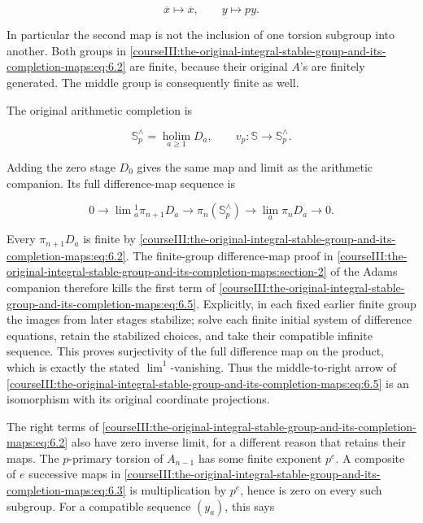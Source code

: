 \begin{equation}
\overline x\longmapsto\overline x,
 \qquad y\longmapsto py.
 \label{courseIII:the-original-integral-stable-group-and-its-completion-maps:eq:6.3}
\end{equation}

In particular the second map is not the inclusion of one torsion subgroup into another. Both groups in \eqref{courseIII:the-original-integral-stable-group-and-its-completion-maps:eq:6.2} are finite, because their original \(A\)'s are finitely generated. The middle group is consequently finite as well.

The original arithmetic completion is

\begin{equation}
\mathbb S^{\wedge}_p=\operatorname*{holim}_{a\geq1}D_a,
 \qquad v_p:\mathbb S\longrightarrow\mathbb S^{\wedge}_p.
 \label{courseIII:the-original-integral-stable-group-and-its-completion-maps:eq:6.4}
\end{equation}

Adding the zero stage \(D_0\) gives the same map and limit as the arithmetic companion. Its full difference-map sequence is

\begin{equation}
0\longrightarrow\lim{}^1_a\pi_{n+1}D_a
 \longrightarrow\pi_n(\mathbb S^{\wedge}_p)
 \longrightarrow\lim_a\pi_nD_a\longrightarrow0.
 \label{courseIII:the-original-integral-stable-group-and-its-completion-maps:eq:6.5}
\end{equation}

Every \(\pi_{n+1}D_a\) is finite by \eqref{courseIII:the-original-integral-stable-group-and-its-completion-maps:eq:6.2}. The finite-group difference-map proof in \cref{courseIII:the-original-integral-stable-group-and-its-completion-maps:section-2} of the Adams companion therefore kills the first term of \eqref{courseIII:the-original-integral-stable-group-and-its-completion-maps:eq:6.5}. Explicitly, in each fixed earlier finite group the images from later stages stabilize; solve each finite initial system of difference equations, retain the stabilized choices, and take their compatible infinite sequence. This proves surjectivity of the full difference map on the product, which is exactly the stated \(\lim^1\)-vanishing. Thus the middle-to-right arrow of \eqref{courseIII:the-original-integral-stable-group-and-its-completion-maps:eq:6.5} is an isomorphism with its original coordinate projections.

The right terms of \eqref{courseIII:the-original-integral-stable-group-and-its-completion-maps:eq:6.2} also have zero inverse limit, for a different reason that retains their maps. The \(p\)-primary torsion of \(A_{n-1}\) has some finite exponent \(p^e\). A composite of \(e\) successive maps in \eqref{courseIII:the-original-integral-stable-group-and-its-completion-maps:eq:6.3} is multiplication by \(p^e\), hence is zero on every such subgroup. For a compatible sequence \((y_a)\), this says

